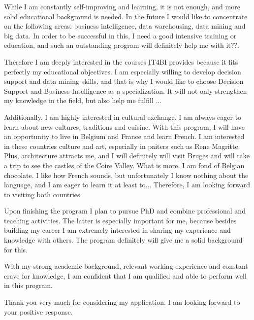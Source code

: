 \documentclass[a4paper,14pt]{extarticle}
\begin{document}
While I am constantly self-improving and learning, it is not enough, and more solid educational background is needed. In the future I would like to concentrate on the following areas: business intelligence, data warehousing, data mining and big data. In order to be successful in this, I need a good intensive training or education, and such an outstanding program will definitely help me with it??.

Therefore I am deeply interested in the courses \b{IT4BI} provides because it fits perfectly my educational objectives. I am especially willing to develop decision support and data mining skills, and that is why I would like to choose \b{Decision Support and Business Intelligence} as a specialization. 
It will not only strengthen my knowledge in the field, but also help me fulfill ...

Additionally, I am highly interested in cultural exchange. I am always eager to learn about new cultures, traditions and cuisine. With this program, I will have an opportunity to live in Belgium and France and learn French. I am interested in these countries culture and art, especially in paiters such as Rene Magritte. Plus, architecture attracts me, and I will definitely will visit Bruges and will take a trip to see the castles of the Coire Valley. What is more, I am fond of Belgian chocolate. I like how French sounds, but unfortunately I know nothing about the language, and I am eager to learn it at least to... Therefore, I am looking forward to visiting both countries. 

Upon finishing the program I plan to pursue PhD and combine professional and teaching activities. The latter is especially important for me, because besides building my career I am extremely interested in sharing my experience and knowledge with others. The program definitely will give me a solid background for this. 

With my strong academic background, relevant working experience and constant crave for knowledge, I am confident that I am qualified and able to perform well in this program. 

Thank you very much for considering my application. I am looking forward to your positive response.
\end{document}
